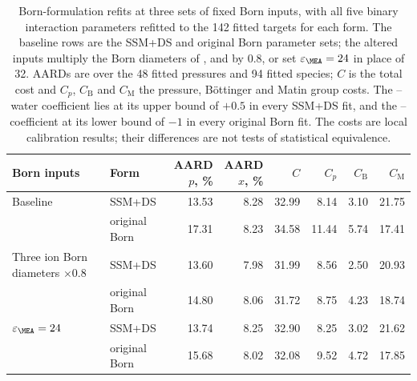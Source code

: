 \begin{table}[pos=!htb]
    \centering
    \caption{Born-formulation refits at three sets of fixed Born inputs, with all five binary interaction parameters refitted to the 142 fitted targets for each form.
    The baseline rows are the SSM+DS and original Born parameter sets; the altered inputs multiply the Born diameters of \MEAH, \MEACOO and \HCOthree by 0.8, or set \(\varepsilon_{\MEA}=24\) in place of 32.
    AARDs are over the 48 fitted pressures and 94 fitted species; \(C\) is the total cost and \(C_p\), \(C_{\mathrm{B}}\) and \(C_{\mathrm{M}}\) the pressure, B\"ottinger and Matin group costs.
    The \HCOthree--water coefficient lies at its upper bound of \(+0.5\) in every SSM+DS fit, and the \MEAH--\MEACOO coefficient at its lower bound of \(-1\) in every original Born fit.
    The costs are local calibration results; their differences are not tests of statistical equivalence.}
    \label{tab:born-formulation-refits}
    \begin{tabularx}{\linewidth}{@{}>{\raggedright\arraybackslash}X l r r r r r r@{}}
        \toprule
        Born inputs & Form & \makecell{AARD\\\(p\), \%} & \makecell{AARD\\\(x\), \%} & \(C\) & \(C_p\) & \(C_{\mathrm{B}}\) & \(C_{\mathrm{M}}\) \\
        \midrule
        Baseline & SSM+DS & 13.53 & 8.28 & 32.99 & 8.14 & 3.10 & 21.75 \\
         & original Born & 17.31 & 8.23 & 34.58 & 11.44 & 5.74 & 17.41 \\
        \midrule
        Three ion Born diameters \(\times0.8\) & SSM+DS & 13.60 & 7.98 & 31.99 & 8.56 & 2.50 & 20.93 \\
         & original Born & 14.80 & 8.06 & 31.72 & 8.75 & 4.23 & 18.74 \\
        \midrule
        \(\varepsilon_{\MEA}=24\) & SSM+DS & 13.74 & 8.25 & 32.90 & 8.25 & 3.02 & 21.62 \\
         & original Born & 15.68 & 8.02 & 32.08 & 9.52 & 4.72 & 17.85 \\
        \bottomrule
    \end{tabularx}
\end{table}
